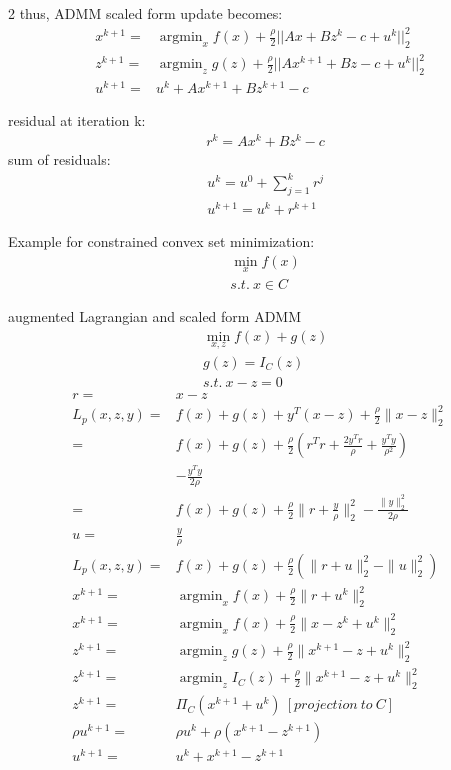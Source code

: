 \documentclass[8pt]{extarticle}
\DeclareMathOperator*{\argmin}{argmin}
\newcommand{\norm}[1]{\|#1\|}
\begin{document}
\begin{multicols*}{2}
  thus, ADMM scaled form update becomes:
  \begin{align*}
    x^{k+1} = & \argmin_{x} f(x) + \frac{\rho}{2}||Ax + Bz^k - c + u^k||_2^2\\
    z^{k+1} = & \argmin_{z} g(z) + \frac{\rho}{2}||Ax^{k+1} + Bz - c + u^k||_2^2\\
    u^{k+1} = & u^k + Ax^{k+1} +Bz^{k+1} - c
  \end{align*}

  residual at iteration k:
  \begin{align*}
    &r^k = Ax^k + Bz^k - c
  \end{align*}
  sum of residuals:
  \begin{align*}
    &u^k = u^0 + \sum_{j=1}^{k} r^j\\
    &u^{k+1} = u^k + r^{k+1}
  \end{align*}


  \vfill\null
  \columnbreak
  
  Example for constrained convex set minimization:
  \begin{align*}
    &\min_x f(x)\\
    &s.t.\ x \in C
  \end{align*}

  augmented Lagrangian and scaled form ADMM
  \begin{align*}
    &\min_{x,z} f(x) + g(z)\\
    &g(z) = I_C(z)\\
    &s.t.\ x-z=0
  \end{align*}
  \begin{align*}
    r=&x-z\\
    L_p(x,z,y) =& f(x) + g(z) + y^T(x-z) + \frac{\rho}{2} \norm{x-z}_2^2\\
               =& f(x) + g(z) + \frac{\rho}{2}(r^T r + \frac{2 y^T r}{\rho} + \frac{y^T y}{\rho^2})\\
                & - \frac{y^T y}{2 \rho}\\
    =& f(x) + g(z) + \frac{\rho}{2} \norm{r+\frac{y}{\rho}}_2^2 - \frac{\norm{y}_2^2}{2\rho}\\
    u=& \frac{y}{\rho}\\
    L_p(x,z,y) =& f(x) + g(z) + \frac{\rho}{2}(\norm{r+u}_2^2 - \norm{u}_2^2)\\
    x^{k+1} =& \argmin_x f(x) + \frac{\rho}{2} \norm{r+u^k}_2^2\\
    x^{k+1} =& \argmin_x f(x) + \frac{\rho}{2} \norm{x-z^k+u^k}_2^2\\
    z^{k+1} =& \argmin_z g(z) + \frac{\rho}{2} \norm{x^{k+1}-z+u^k}_2^2\\
    z^{k+1} =& \argmin_z I_C(z) + \frac{\rho}{2} \norm{x^{k+1}-z+u^k}_2^2\\
    z^{k+1} =& \Pi_C(x^{k+1}+u^k)\ [projection\ to\ C]\\
    \rho u^{k+1} =& \rho u^k + \rho (x^{k+1} - z^{k+1})\\
    u^{k+1} =& u^k + x^{k+1} - z^{k+1}
  \end{align*}


\end{multicols*}
\end{document}
